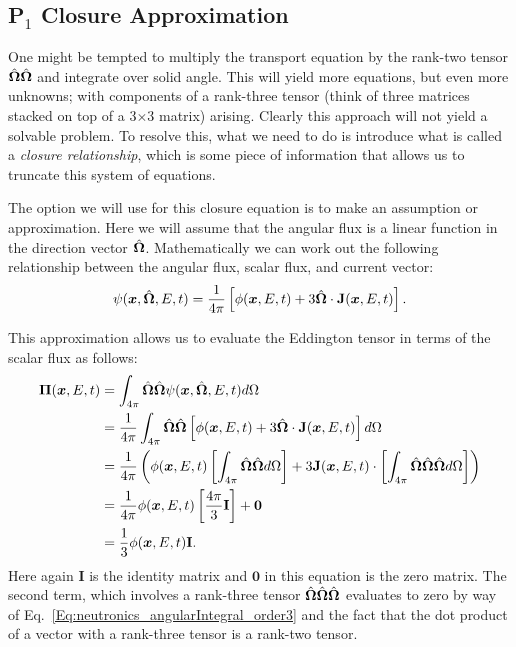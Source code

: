 \subsection{P$_1$ Closure Approximation}

One might be tempted to multiply the transport equation by the rank-two tensor $\hat{\mathbf{\Omega}} \hat{\mathbf{\Omega}}$ and integrate over solid angle. This will yield more equations, but even more unknowns; with components of a rank-three tensor (think of three matrices stacked on top of a 3$\times$3 matrix) arising. Clearly this approach will not yield a solvable problem. To resolve this, what we need to do is introduce what is called a \emph{closure relationship}, which is some piece of information that allows us to truncate this system of equations. 

The option we will use for this closure equation is to make an assumption or approximation. Here we will assume that the angular flux is a linear function in the direction vector $\hat{\mathbf{\Omega}}$. Mathematically we can work out the following relationship between the angular flux, scalar flux, and current vector:
\begin{align} \label{Eq:neutronics_P1Closure}
  \psi(\bm{x},\hat{\mathbf{\Omega}},E,t) = \frac{1}{4\pi} \left[ \phi(\bm{x},E,t) + 3 \hat{\mathbf{\Omega}} \cdot \mathbf{J}(\bm{x},E,t) \right] .
\end{align}

This approximation allows us to evaluate the Eddington tensor in terms of the scalar flux as follows:
\begin{align}
  \boldsymbol\Pi(\bm{x},E,t) 
  &= \int_{4\pi} \hat{\mathbf{\Omega}} \hat{\mathbf{\Omega}} \psi(\bm{x},\hat{\mathbf{\Omega}},E,t) d\Omega \nonumber \\
  &= \frac{1}{4\pi} \int_{4\pi} \hat{\mathbf{\Omega}} \hat{\mathbf{\Omega}} \left[ \phi(\bm{x},E,t) + 3 \hat{\mathbf{\Omega}} \cdot \mathbf{J}(\bm{x},E,t) \right] d\Omega \nonumber \\
  &= \frac{1}{4\pi}  \left(  \phi(\bm{x},E,t) \left[ \int_{4\pi} \hat{\mathbf{\Omega}} \hat{\mathbf{\Omega}} d\Omega \right]  + 3 \mathbf{J}(\bm{x},E,t) \cdot \left[ \int_{4\pi} \hat{\mathbf{\Omega}} \hat{\mathbf{\Omega}} \hat{\mathbf{\Omega}} d\Omega \right] \right)  \nonumber \\
  &= \frac{1}{4\pi} \phi(\bm{x},E,t) \left[ \frac{4\pi}{3} \mathbf{I} \right]  + \mathbf{0} \nonumber \\
  &= \frac{1}{3} \phi(\bm{x},E,t) \mathbf{I}.
\end{align}
Here again $\mathbf{I}$ is the identity matrix and $\mathbf{0}$ in this equation is the zero matrix. The second term, which involves a rank-three tensor $\hat{\mathbf{\Omega}} \hat{\mathbf{\Omega}} \hat{\mathbf{\Omega}}$ evaluates to zero by way of Eq.~\eqref{Eq:neutronics_angularIntegral_order3} and the fact that the dot product of a vector with a rank-three tensor is a rank-two tensor.

